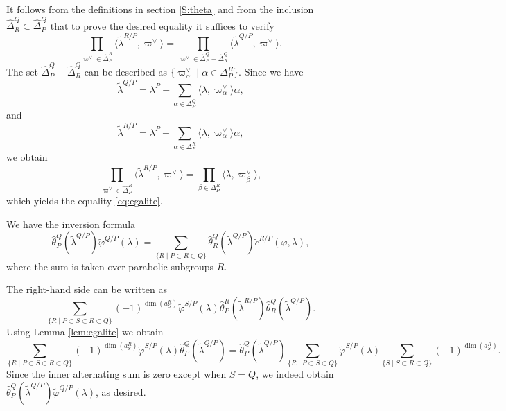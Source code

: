 \begin{paragr}
\begin{preuve}
It follows from the definitions in section \ref{S:theta} and from the inclusion $\hat{\Delta}_R^Q\subset \hat{\Delta}_P^Q$ that to prove the desired equality it suffices to verify
\begin{equation}
  \label{eq:egalite}
  \prod_{\varpi^\vee\in \hat{\Delta}_P^R} \langle \tilde{\lambda}^{R/P},\varpi^\vee \rangle=\prod_{\varpi^\vee\in \hat{\Delta}_P^Q-\hat{\Delta}_R^Q} \langle \tilde{\lambda}^{Q/P},\varpi^\vee \rangle.
\end{equation}
The set $\hat{\Delta}_P^Q-\hat{\Delta}_R^Q$ can be described as $\{\varpi^\vee_\alpha \mid \alpha \in \Delta_P^R\}$. Since we have 
$$ \tilde{\lambda}^{Q/P}=\lambda^P+\sum_{\alpha\in \Delta_P^Q} \langle \lambda , \varpi_\alpha^\vee \rangle \alpha,$$
and
$$ \tilde{\lambda}^{R/P}=\lambda^P+\sum_{\alpha\in \Delta_P^R} \langle \lambda , \varpi_\alpha^\vee \rangle \alpha,$$
we obtain 
$$\prod_{\varpi^\vee\in \hat{\Delta}_P^R} \langle \tilde{\lambda}^{R/P},\varpi^\vee \rangle= \prod_{\beta\in \Delta_P^R} \langle \lambda , \varpi_\beta^\vee \rangle,$$
which yields the equality \eqref{eq:egalite}.
\end{preuve}

\begin{lemme}\label{lem:invtilde} We have the inversion formula
   $$\hat{\theta}_P^Q(\tilde{\lambda}^{Q/P})\tilde{\varphi}^{Q/P}(\lambda)=\sum_{\{R\mid P\subset R\subset Q\}} \hat{\theta}_R^Q(\tilde{\lambda}^{Q/P})
  \tilde{c}^{R/P}(\varphi,\lambda),$$
where the sum is taken over parabolic subgroups $R$.
\end{lemme}

\begin{preuve}
The right-hand side can be written as
  \begin{equation}
    \label{eq:form}
    \sum_{\{R\mid P\subset S\subset  R\subset Q\}} (-1)^{\dim(a_S^R)} \tilde{\varphi}^{S/P}(\lambda) \hat{\theta}_P^R(\tilde{\lambda}^{R/P}) \hat{\theta}_R^Q(\tilde{\lambda}^{Q/P}).
  \end{equation}
Using Lemma \ref{lem:egalite} we obtain
$$ \sum_{\{R\mid P\subset S\subset  R\subset Q\}} (-1)^{\dim(a_S^R)} \tilde{\varphi}^{S/P}(\lambda) \hat{\theta}_P^Q(\tilde{\lambda}^{Q/P})
=\hat{\theta}_P^Q(\tilde{\lambda}^{Q/P}) \sum_{\{R\mid P\subset  S\subset Q\}}  \tilde{\varphi}^{S/P}(\lambda)\sum_{\{S \mid S\subset  R\subset Q\}} (-1)^{\dim(a_S^R)}.$$
Since the inner alternating sum is zero except when $S=Q$, we indeed obtain $\hat{\theta}_P^Q(\tilde{\lambda}^{Q/P})\tilde{\varphi}^{Q/P}(\lambda)$, as desired.
\end{preuve}
\end{paragr} 

